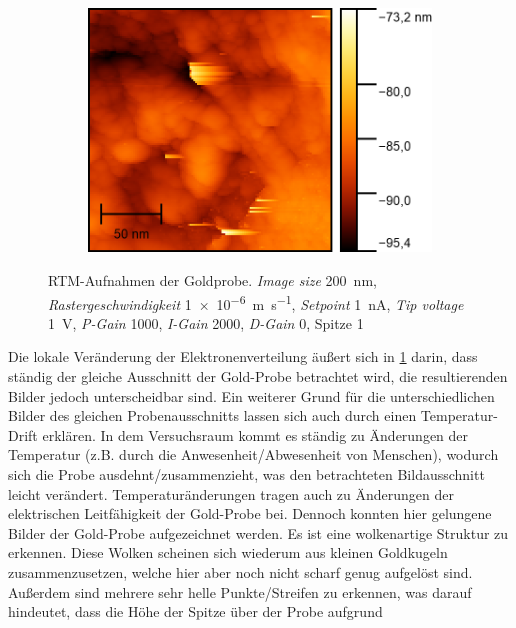 \begin{figure}[H]
\begin{subfigure}{0.45\textwidth}
        \caption{}
    \end{subfigure}
    \begin{subfigure}{0.45\textwidth}
        \centering
        \includegraphics[width=\linewidth]{../figs/Gold10449}
        \caption{}
    \end{subfigure}
    \caption{RTM-Aufnahmen der Goldprobe. \textit{Image size} \SI{200}{\nano \meter}, \textit{Rastergeschwindigkeit} \SI{1e-6}{\meter \per \second}, \textit{Setpoint} \SI{1}{\nano \ampere},
    \textit{Tip voltage} \SI{1}{\volt}, \textit{P-Gain} \num{1000}, \textit{I-Gain} \num{2000}, \textit{D-Gain} \num{0}, Spitze 1}\label{fig:gold1}
\end{figure}
Die lokale Veränderung der Elektronenverteilung äußert sich in \cref{fig:gold1} darin, dass ständig der gleiche Ausschnitt der Gold-Probe betrachtet wird,
die resultierenden Bilder jedoch unterscheidbar sind. Ein weiterer Grund für die unterschiedlichen Bilder des gleichen Probenausschnitts lassen sich auch
durch einen Temperatur-Drift erklären. In dem Versuchsraum kommt es ständig zu Änderungen der Temperatur (z.B. durch die Anwesenheit/Abwesenheit von Menschen),
wodurch sich die Probe ausdehnt/zusammenzieht, was den betrachteten Bildausschnitt leicht verändert. Temperaturänderungen tragen auch zu Änderungen
der elektrischen Leitfähigkeit der Gold-Probe bei. Dennoch konnten hier gelungene Bilder der Gold-Probe aufgezeichnet werden. Es ist eine
wolkenartige Struktur zu erkennen. Diese Wolken scheinen sich wiederum aus kleinen Goldkugeln zusammenzusetzen, welche hier aber noch nicht
scharf genug aufgelöst sind. Außerdem sind mehrere sehr helle Punkte/Streifen zu erkennen, was darauf hindeutet, dass die Höhe der Spitze über der Probe aufgrund
